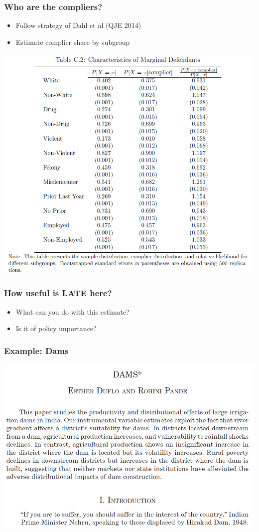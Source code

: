 \begin{frame}
  \frametitle{Who are the compliers?}
  \begin{itemize}
    \item Follow strategy of Dahl et al (QJE 2014)
    \item Estimate complier share by subgroup
   \end{itemize}
   \includegraphics[width=.9\textwidth]{./resources/DobbieComplierStats} 
\end{frame}

\begin{frame}
  \frametitle{How useful is LATE here?}
  \begin{itemize}
    \item What can you do with this estimate?
    \item Is it of policy importance?
   \end{itemize}
\end{frame}

\begin{frame}
  \frametitle{Example: Dams}
  \begin{center}
    \includegraphics[width=.9\textwidth]{./resources/DamsAbstract}
  \end{center}  
\end{frame}

